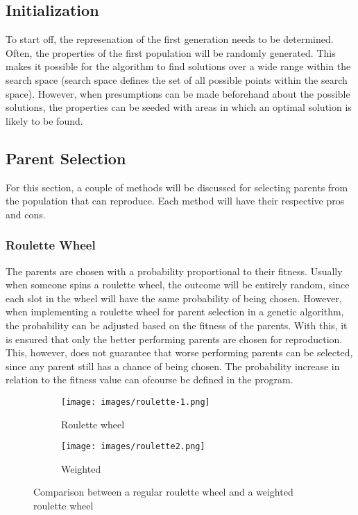 \documentclass{article}
\begin{document}
\subsection{Initialization}
To start off, the represenation of the first generation needs to be determined. Often, the properties of the first population will be randomly generated. This makes it possible for the algorithm to find solutions over a wide range within the search space (search space defines the set of all possible points within the search space). However, when presumptions can be made beforehand about the possible solutions, the properties can be seeded with areas in which an optimal solution is likely to be found.

\bigskip
\subsection{Parent Selection}
For this section, a couple of methods will be discussed for selecting parents from the population that can reproduce. Each method will have their respective pros and cons.

\subsubsection{Roulette Wheel}
The parents are chosen with a probability proportional to their fitness. Usually when someone spins a roulette wheel, the outcome will be entirely random, since each slot in the wheel will have the same probability of being chosen. However, when implementing a roulette wheel for parent selection in a genetic algorithm, the probability can be adjusted based on the fitness of the parents. With this, it is ensured that only the better performing parents are chosen for reproduction. This, however, does not guarantee that worse performing parents can be selected, since any parent still has a chance of being chosen. The probability increase in relation to the fitness value can ofcourse be defined in the program. 

\begin{figure}[h!]
    \centering
    \begin{subfigure}[b]{0.2\linewidth}
      \texttt{[image: images/roulette-1.png]}
      \caption{Roulette wheel}
    \end{subfigure}
    \begin{subfigure}[b]{0.2\linewidth}
      \texttt{[image: images/roulette2.png]}
      \caption{Weighted}
    \end{subfigure}
    \caption{Comparison between a regular roulette wheel and a weighted roulette wheel}
    \label{fig:roulette}
\end{figure}
\end{document}
